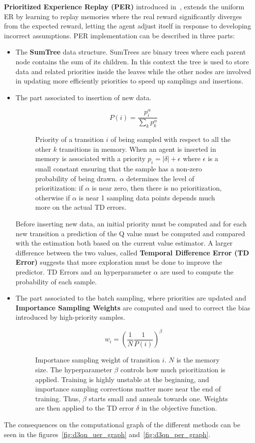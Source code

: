 \documentclass[11pt, a4paper, hidelinks]{report}
\begin{document}
\textbf{Prioritized Experience Replay (PER)} introduced in~\citep{prioritized}, extends the uniform ER by learning to replay memories where the real reward significantly diverges from the expected reward, letting the agent adjust itself in response to developing incorrect assumptions.
PER implementation can be described in three parts:
\begin{itemize}
	\item The \textbf{SumTree} data structure.
SumTrees are binary trees where each parent node contains the sum of its children.
In this context the tree is used to store data and related priorities inside the leaves while the other nodes are involved in updating more efficiently priorities to speed up samplings and insertions.
	\item The part associated to insertion of new data.
\begin{figure}
	\[ P(i) = \frac{p_{i}^{\alpha}}{\sum_{k}p_{k}^{\alpha}} \]
	\caption{Priority of a transition $i$ of being sampled with respect to all the other $k$ transitions in memory. When an agent is inserted in memory is associated with a priority $p_i = |\delta| + \epsilon$ where $\epsilon$ is a small constant ensuring that the sample has a non-zero probability of being drawn. $\alpha$ determines the level of prioritization: if $\alpha$ is near zero, then there is no prioritization, otherwise if $\alpha$ is near 1 sampling data points depends much more on the actual TD errors.}\label{fig:per_priority}
\end{figure}
Before inserting new data, an initial priority must be computed and for each new transition a prediction of the Q value must be computed and compared with the estimation both based on the current value estimator.
A larger difference between the two values, called \textbf{Temporal Difference Error (TD Error)} suggests that more exploration must be done to improve the predictor.
TD Errors and an hyperparameter $\alpha$ are used to compute the probability of each sample.
	\item The part associated to the batch sampling, where priorities are updated and \textbf{Importance Sampling Weights} are computed and used to correct the bias introduced by high-priority samples.
\begin{figure}
    \[ w_{i} = \left(\frac{1}{N} \frac{1}{P(i)} \right)^{\beta} \]
	\caption{Importance sampling weight of transition $i$. $N$ is the memory size. The hyperparameter $\beta$ controls how much prioritization is applied. Training is highly unstable at the beginning, and importance sampling corrections matter more near the end of training. Thus, $\beta$ starts small and anneals towards one. Weights are then applied to the TD error $\delta$ in the objective function.}\label{fig:importance_weights}
\end{figure}
\end{itemize}
The consequences on the computational graph of the different methods can be seen in the figures~\ref{fig:d3qn_uer_graph} and~\ref{fig:d3qn_per_graph}.
\end{document}

